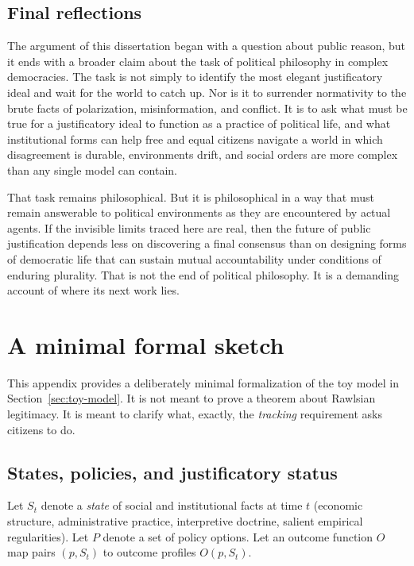 \documentclass[12pt]{report}
\begin{document}
\section{Final reflections}

The argument of this dissertation began with a question about public reason, but it ends with a broader claim about the task of political philosophy in complex democracies. The task is not simply to identify the most elegant justificatory ideal and wait for the world to catch up. Nor is it to surrender normativity to the brute facts of polarization, misinformation, and conflict. It is to ask what must be true for a justificatory ideal to function as a practice of political life, and what institutional forms can help free and equal citizens navigate a world in which disagreement is durable, environments drift, and social orders are more complex than any single model can contain.

That task remains philosophical. But it is philosophical in a way that must remain answerable to political environments as they are encountered by actual agents. If the invisible limits traced here are real, then the future of public justification depends less on discovering a final consensus than on designing forms of democratic life that can sustain mutual accountability under conditions of enduring plurality. That is not the end of political philosophy. It is a demanding account of where its next work lies.

\appendix

\chapter{A minimal formal sketch}
\label{app:formal-model}

This appendix provides a deliberately minimal formalization of the toy model in Section~\ref{sec:toy-model}. It is not meant to prove a theorem about Rawlsian legitimacy. It is meant to clarify what, exactly, the \emph{tracking} requirement asks citizens to do.

\section{States, policies, and justificatory status}

Let $S_t$ denote a \emph{state} of social and institutional facts at time $t$ (economic structure, administrative practice, interpretive doctrine, salient empirical regularities). Let $P$ denote a set of policy options. Let an outcome function $O$ map pairs $(p,S_t)$ to outcome profiles $O(p,S_t)$.
\end{document}
